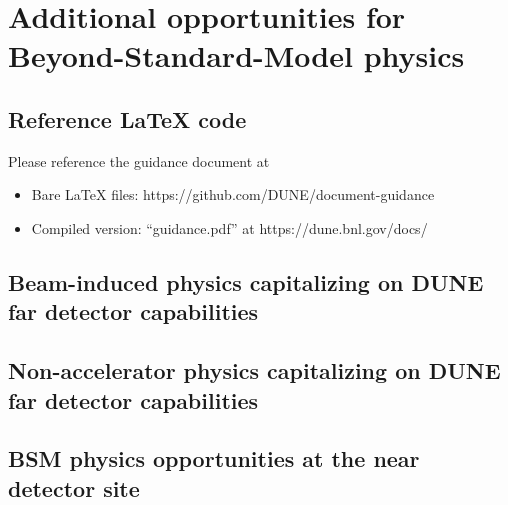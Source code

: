 \chapter{Additional opportunities for Beyond-Standard-Model physics }
\label{ch:bsm}

\section{Reference LaTeX code}

Please reference the guidance document at 

\begin{itemize}
\item Bare LaTeX files: https://github.com/DUNE/document-guidance
\item Compiled version: ``guidance.pdf'' at https://dune.bnl.gov/docs/
\end{itemize}


\section{Beam-induced physics capitalizing on DUNE far detector capabilities}
\label{sec:bsm-beam}


\section{Non-accelerator physics capitalizing on DUNE far detector capabilities}
\label{sec:bsm-nonaccel}


\section{BSM physics opportunities at the near detector site}
\label{sec:bsm-nd}

